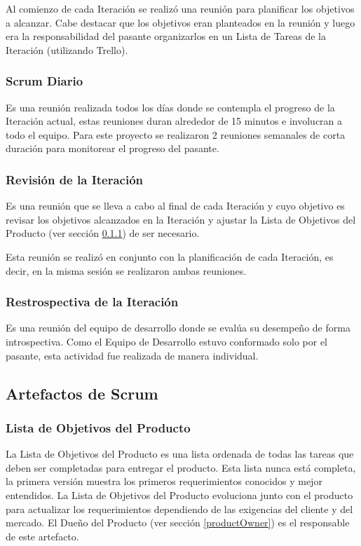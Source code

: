 Al comienzo de cada Iteración se realizó una reunión para planificar los objetivos a alcanzar. Cabe destacar que los objetivos eran planteados en la reunión y luego era la responsabilidad del pasante organizarlos en un Lista de Tareas de la Iteración (utilizando Trello).

\subsubsection{Scrum Diario}
Es una reunión realizada todos los días donde se contempla el progreso de la Iteración actual, estas reuniones duran alrededor de 15 minutos e involucran a todo el equipo. Para este proyecto se realizaron 2 reuniones semanales de corta duración para monitorear el progreso del pasante.

\subsubsection{Revisión de la Iteración}
Es una reunión que se lleva a cabo al final de cada Iteración y cuyo objetivo es revisar los objetivos alcanzados en la Iteración y ajustar la Lista de Objetivos del Producto (ver sección \ref{productBacklog}) de ser necesario.

Esta reunión se realizó en conjunto con la planificación de cada Iteración, es decir, en la misma sesión se realizaron ambas reuniones.

\subsubsection{Restrospectiva de la Iteración}
Es una reunión del equipo de desarrollo donde se evalúa su desempeño de forma introspectiva. Como el Equipo de Desarrollo estuvo conformado solo por el pasante, esta actividad fue realizada de manera individual.


\subsection{Artefactos de Scrum}
\subsubsection{Lista de Objetivos del Producto} \label{productBacklog}
La Lista de Objetivos del Producto es una lista ordenada de todas las tareas que deben ser completadas para entregar el producto. Esta lista nunca está completa, la primera versión muestra los primeros requerimientos conocidos y mejor entendidos. \cite{scrumSchwaber} La Lista de Objetivos del Producto evoluciona junto con el producto para actualizar los requerimientos dependiendo de las exigencias del cliente y del mercado. El Dueño del Producto (ver sección \ref{productOwner}) es el responsable de este artefacto.

